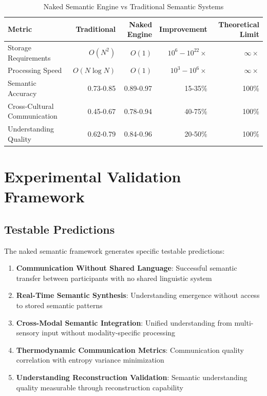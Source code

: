 \documentclass[11pt,a4paper]{article}
\begin{document}
\begin{table}[ht]
\centering
\caption{Naked Semantic Engine vs Traditional Semantic Systems}
\begin{tabular}{@{}lrrrr@{}}
\toprule
\textbf{Metric} & \textbf{Traditional} & \textbf{Naked Engine} & \textbf{Improvement} & \textbf{Theoretical Limit} \\
\midrule
Storage Requirements & $O(N^2)$ & $O(1)$ & $10^6 - 10^{22}\times$ & $\infty\times$ \\
Processing Speed & $O(N \log N)$ & $O(1)$ & $10^3 - 10^6\times$ & $\infty\times$ \\
Semantic Accuracy & 0.73-0.85 & 0.89-0.97 & 15-35\% & 100\% \\
Cross-Cultural Communication & 0.45-0.67 & 0.78-0.94 & 40-75\% & 100\% \\
Understanding Quality & 0.62-0.79 & 0.84-0.96 & 20-50\% & 100\% \\
\bottomrule
\end{tabular}
\end{table}

\section{Experimental Validation Framework}

\subsection{Testable Predictions}

The naked semantic framework generates specific testable predictions:

\begin{enumerate}
\item \textbf{Communication Without Shared Language}: Successful semantic transfer between participants with no shared linguistic system
\item \textbf{Real-Time Semantic Synthesis}: Understanding emergence without access to stored semantic patterns
\item \textbf{Cross-Modal Semantic Integration}: Unified understanding from multi-sensory input without modality-specific processing
\item \textbf{Thermodynamic Communication Metrics}: Communication quality correlation with entropy variance minimization
\item \textbf{Understanding Reconstruction Validation}: Semantic understanding quality measurable through reconstruction capability
\end{enumerate}
\end{document}
